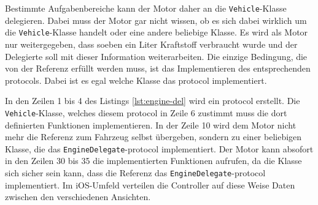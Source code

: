 Bestimmte Aufgabenbereiche kann der Motor daher an die \texttt{Vehicle}-Klasse delegieren.
Dabei muss der Motor gar nicht wissen, ob es sich dabei wirklich um die \texttt{Vehicle}-Klasse handelt oder eine andere beliebige Klasse.
Es wird als Motor nur weitergegeben, dass soeben ein Liter Kraftstoff verbraucht wurde und der Delegierte soll mit dieser Information weiterarbeiten.
Die einzige Bedingung, die von der Referenz erfüllt werden muss, ist das Implementieren des entsprechenden \Glspl{protocol}.
Dabei ist es egal welche Klasse das \Gls{protocol} implementiert.

In den Zeilen 1 bis 4 des Listings \ref{lst:engine-del} wird ein \Gls{protocol} erstellt.
Die \texttt{Vehicle}-Klasse, welches diesem \Gls{protocol} in Zeile 6 zustimmt muss die dort definierten Funktionen implementieren.
In der Zeile 10 wird dem Motor nicht mehr die Referenz zum Fahrzeug selbst übergeben, sondern zu einer beliebigen Klasse, die das \texttt{EngineDelegate}-\Gls{protocol} implementiert.
Der Motor kann absofort in den Zeilen 30 bis 35 die implementierten Funktionen aufrufen, da die Klasse sich sicher sein kann, dass die Referenz das \texttt{EngineDelegate}-\Gls{protocol} implementiert.
Im iOS-Umfeld verteilen die Controller auf diese Weise Daten zwischen den verschiedenen Ansichten.

